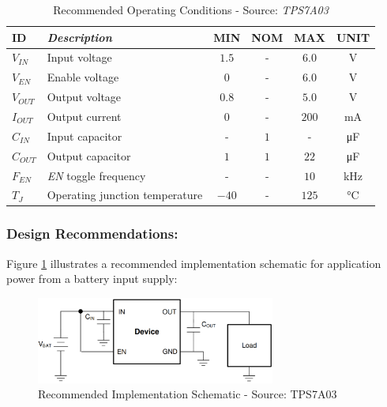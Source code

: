 \documentclass[report.tex]{subfiles}
\begin{document}
\begin{table}[H]
\centering
\begin{tabularx}{0.9\textwidth}{|l|X|c|c|c|c|}\hline
\textbf{ID} & \textit{Description} & \textbf{MIN} & \textbf{NOM} & \textbf{MAX} & \textbf{UNIT}\\\hline
$V_{IN}$ & Input voltage & $1.5$ & - & $6.0$ & \si{\volt}\\\hline
$V_{EN}$ & Enable voltage & $0$ & - & $6.0$ & \si{\volt}\\\hline
$V_{OUT}$ & Output voltage & $0.8$ & - & $5.0$ & \si{\volt}\\\hline
$I_{OUT}$ & Output current & $0$ & - & $200$ & \si{\milli\ampere}\\\hline
$C_{IN}$ & Input capacitor & - & $1$ & - & \si{\micro\farad}\\\hline
$C_{OUT}$ & Output capacitor & $1$ & $1$ & $22$ & \si{\micro\farad}\\\hline
$F_{EN}$ & \textit{EN} toggle frequency & - & - & $10$ & \si{\kilo\hertz}\\\hline
$T_J$ & Operating junction temperature & $-40$ & - & $125$ & \si{\celsius}\\\hline
\end{tabularx}
\caption{Recommended Operating Conditions - Source: \textit{TPS7A03}\cite{TPS7A03}}
\label{tab:tps7a03_recom_oper_cond}
\end{table}

\subsubsection{Design Recommendations:} \label{sec:ldo_reg_sel}
Figure \ref{fig:tps7a03_impl_schematic} illustrates a recommended implementation schematic for application power from a battery input supply:

\begin{figure}[H]
	\centering
	\includegraphics[width=0.7\textwidth]{Include/Figure/comp/tps7a03_recom_app.png}
	\caption{Recommended Implementation Schematic - Source: TPS7A03\cite{TPS7A03}}
	\label{fig:tps7a03_impl_schematic}
\end{figure}
\end{document}

